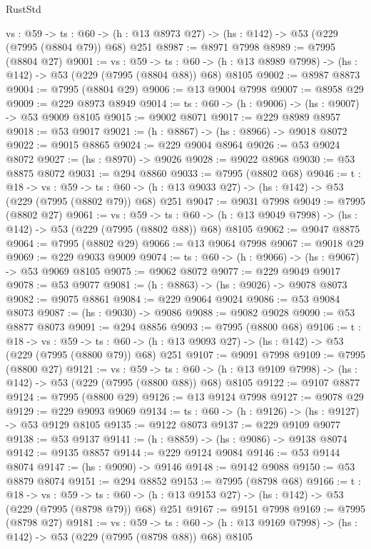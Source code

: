 \begin{lexlean}{RustStd}
\begin{coremodule}
  {vs : @59} ->
  {ts : @60} -> (h : @13 @8973 @27) -> (hs : @142) -> @53 (@229 (@7995 (@8804 @79)) @68) @251
@8987 := @8971 @7998
@8989 := @7995 (@8804 @27)
@9001 := {vs : @59} ->
  {ts : @60} -> (h : @13 @8989 @7998) -> (hs : @142) -> @53 (@229 (@7995 (@8804 @88)) @68) @8105
@9002 := @8987 @8873
@9004 := @7995 (@8804 @29)
@9006 := @13 @9004 @7998
@9007 := @8958 @29
@9009 := @229 @8973 @8949
@9014 := {ts : @60} -> (h : @9006) -> (hs : @9007) -> @53 @9009 @8105
@9015 := @9002 @8071
@9017 := @229 @8989 @8957
@9018 := @53 @9017
@9021 := (h : @8867) -> (hs : @8966) -> @9018 @8072
@9022 := @9015 @8865
@9024 := @229 @9004 @8964
@9026 := @53 @9024 @8072
@9027 := (hs : @8970) -> @9026
@9028 := @9022 @8968
@9030 := @53 @8875 @8072
@9031 := @294 @8860
@9033 := @7995 (@8802 @68)
@9046 := {t : @18} ->
  {vs : @59} ->
  {ts : @60} -> (h : @13 @9033 @27) -> (hs : @142) -> @53 (@229 (@7995 (@8802 @79)) @68) @251
@9047 := @9031 @7998
@9049 := @7995 (@8802 @27)
@9061 := {vs : @59} ->
  {ts : @60} -> (h : @13 @9049 @7998) -> (hs : @142) -> @53 (@229 (@7995 (@8802 @88)) @68) @8105
@9062 := @9047 @8875
@9064 := @7995 (@8802 @29)
@9066 := @13 @9064 @7998
@9067 := @9018 @29
@9069 := @229 @9033 @9009
@9074 := {ts : @60} -> (h : @9066) -> (hs : @9067) -> @53 @9069 @8105
@9075 := @9062 @8072
@9077 := @229 @9049 @9017
@9078 := @53 @9077
@9081 := (h : @8863) -> (hs : @9026) -> @9078 @8073
@9082 := @9075 @8861
@9084 := @229 @9064 @9024
@9086 := @53 @9084 @8073
@9087 := (hs : @9030) -> @9086
@9088 := @9082 @9028
@9090 := @53 @8877 @8073
@9091 := @294 @8856
@9093 := @7995 (@8800 @68)
@9106 := {t : @18} ->
  {vs : @59} ->
  {ts : @60} -> (h : @13 @9093 @27) -> (hs : @142) -> @53 (@229 (@7995 (@8800 @79)) @68) @251
@9107 := @9091 @7998
@9109 := @7995 (@8800 @27)
@9121 := {vs : @59} ->
  {ts : @60} -> (h : @13 @9109 @7998) -> (hs : @142) -> @53 (@229 (@7995 (@8800 @88)) @68) @8105
@9122 := @9107 @8877
@9124 := @7995 (@8800 @29)
@9126 := @13 @9124 @7998
@9127 := @9078 @29
@9129 := @229 @9093 @9069
@9134 := {ts : @60} -> (h : @9126) -> (hs : @9127) -> @53 @9129 @8105
@9135 := @9122 @8073
@9137 := @229 @9109 @9077
@9138 := @53 @9137
@9141 := (h : @8859) -> (hs : @9086) -> @9138 @8074
@9142 := @9135 @8857
@9144 := @229 @9124 @9084
@9146 := @53 @9144 @8074
@9147 := (hs : @9090) -> @9146
@9148 := @9142 @9088
@9150 := @53 @8879 @8074
@9151 := @294 @8852
@9153 := @7995 (@8798 @68)
@9166 := {t : @18} ->
  {vs : @59} ->
  {ts : @60} -> (h : @13 @9153 @27) -> (hs : @142) -> @53 (@229 (@7995 (@8798 @79)) @68) @251
@9167 := @9151 @7998
@9169 := @7995 (@8798 @27)
@9181 := {vs : @59} ->
  {ts : @60} -> (h : @13 @9169 @7998) -> (hs : @142) -> @53 (@229 (@7995 (@8798 @88)) @68) @8105

\end{coremodule}
\end{lexlean}
